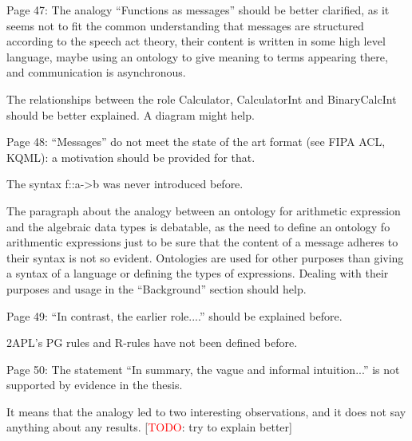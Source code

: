 \documentclass{article}
\newcommand{\todo}[1]{[\textcolor{red}{TODO}: #1]}
\newenvironment{them}{\noindent\begingroup\color{blue}}{\endgroup\par}
\begin{document}
\begin{them}
Page 47:
The analogy “Functions as messages” should be better clarified, as it seems not to fit the common
understanding that messages are structured according to the speech act theory, their content is
written in some high level language, maybe using an ontology to give meaning to terms appearing
there, and communication is asynchronous.
\end{them}
\todo{?}

\begin{them}
The relationships between the role Calculator, CalculatorInt and BinaryCalcInt should be better
explained. A diagram might help.
\end{them}
\todo{}

\begin{them}
Page 48:
“Messages” do not meet the state of the art format (see FIPA ACL, KQML): a motivation should be
provided for that.
\end{them}
\todo{?}

\begin{them}
The syntax f::a->b was never introduced before.
\end{them}
\todo{?}

\begin{them}
The paragraph about the analogy between an ontology for arithmetic expression and the algebraic
data types is debatable, as the need to define an ontology fo arithmentic expressions just to be sure
that the content of a message adheres to their syntax is not so evident. Ontologies are used for other
purposes than giving a syntax of a language or defining the types of expressions. Dealing with their
purposes and usage in the “Background” section should help.
\end{them}
\todo{?}

\begin{them}
Page 49:
“In contrast, the earlier role....” should be explained before.
\end{them}
\todo{?}

\begin{them}
2APL's PG rules and R-rules have not been defined before.
\end{them}
\todo{define 2APL's rules}

\begin{them}
Page 50:
The statement “In summary, the vague and informal intuition...” is not supported by evidence in the
thesis.
\end{them}
It means that the analogy led to two interesting observations, and it does not say anything about any results.
\todo{try to explain better}
\end{document}
